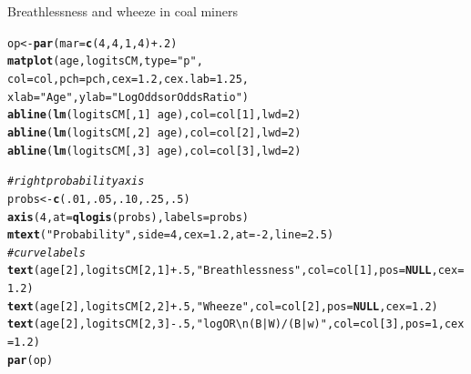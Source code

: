 \documentclass[11pt]{book}\usepackage[]{graphicx}\usepackage[]{color}
\makeatletter
\newcommand{\hlnum}[1]{\textcolor[rgb]{0.686,0.059,0.569}{#1}}%
\newcommand{\hlstr}[1]{\textcolor[rgb]{0.192,0.494,0.8}{#1}}%
\newcommand{\hlcom}[1]{\textcolor[rgb]{0.678,0.584,0.686}{\textit{#1}}}%
\newcommand{\hlopt}[1]{\textcolor[rgb]{0,0,0}{#1}}%
\newcommand{\hlstd}[1]{\textcolor[rgb]{0.345,0.345,0.345}{#1}}%
\newcommand{\hlkwa}[1]{\textcolor[rgb]{0.161,0.373,0.58}{\textbf{#1}}}%
\newcommand{\hlkwb}[1]{\textcolor[rgb]{0.69,0.353,0.396}{#1}}%
\newcommand{\hlkwc}[1]{\textcolor[rgb]{0.333,0.667,0.333}{#1}}%
\newcommand{\hlkwd}[1]{\textcolor[rgb]{0.737,0.353,0.396}{\textbf{#1}}}%
\newenvironment{kframe}{%
 \def\at@end@of@kframe{}%
 \ifinner\ifhmode%
  \def\at@end@of@kframe{\end{minipage}}%
  \begin{minipage}{\columnwidth}%
 \fi\fi%
 \def\FrameCommand##1{\hskip\@totalleftmargin \hskip-\fboxsep
 \colorbox{shadecolor}{##1}\hskip-\fboxsep
     \hskip-\linewidth \hskip-\@totalleftmargin \hskip\columnwidth}%
 \MakeFramed {\advance\hsize-\width
   \@totalleftmargin\z@ \linewidth\hsize
   \@setminipage}}%
 {\par\unskip\endMakeFramed%
 \at@end@of@kframe}
\newenvironment{knitrout}{}{} %
\renewenvironment{knitrout}{\small\renewcommand{\baselinestretch}{.85}}{} %
\makeatother
\begin{document}
\begin{Example}[coalminers]{Breathlessness and wheeze in coal miners}
\begin{knitrout}
\begin{kframe}
\begin{alltt}
\hlstd{op} \hlkwb{<-} \hlkwd{par}\hlstd{(}\hlkwc{mar}\hlstd{=}\hlkwd{c}\hlstd{(}\hlnum{4}\hlstd{,} \hlnum{4}\hlstd{,} \hlnum{1}\hlstd{,} \hlnum{4}\hlstd{)}\hlopt{+}\hlnum{.2}\hlstd{)}
\hlkwd{matplot}\hlstd{(age, logitsCM,} \hlkwc{type}\hlstd{=}\hlstr{"p"}\hlstd{,}
  \hlkwc{col}\hlstd{=col,} \hlkwc{pch}\hlstd{=pch,} \hlkwc{cex}\hlstd{=}\hlnum{1.2}\hlstd{,} \hlkwc{cex.lab}\hlstd{=}\hlnum{1.25}\hlstd{,}
  \hlkwc{xlab}\hlstd{=}\hlstr{"Age"}\hlstd{,} \hlkwc{ylab}\hlstd{=}\hlstr{"Log Odds or Odds Ratio"}\hlstd{)}
\hlkwd{abline}\hlstd{(}\hlkwd{lm}\hlstd{(logitsCM[,}\hlnum{1}\hlstd{]} \hlopt{~} \hlstd{age),} \hlkwc{col}\hlstd{=col[}\hlnum{1}\hlstd{],} \hlkwc{lwd}\hlstd{=}\hlnum{2}\hlstd{)}
\hlkwd{abline}\hlstd{(}\hlkwd{lm}\hlstd{(logitsCM[,}\hlnum{2}\hlstd{]} \hlopt{~} \hlstd{age),} \hlkwc{col}\hlstd{=col[}\hlnum{2}\hlstd{],} \hlkwc{lwd}\hlstd{=}\hlnum{2}\hlstd{)}
\hlkwd{abline}\hlstd{(}\hlkwd{lm}\hlstd{(logitsCM[,}\hlnum{3}\hlstd{]} \hlopt{~} \hlstd{age),} \hlkwc{col}\hlstd{=col[}\hlnum{3}\hlstd{],} \hlkwc{lwd}\hlstd{=}\hlnum{2}\hlstd{)}

\hlcom{# right probability axis}
\hlstd{probs} \hlkwb{<-} \hlkwd{c}\hlstd{(}\hlnum{.01}\hlstd{,} \hlnum{.05}\hlstd{,} \hlnum{.10}\hlstd{,} \hlnum{.25}\hlstd{,} \hlnum{.5}\hlstd{)}
\hlkwd{axis}\hlstd{(}\hlnum{4}\hlstd{,} \hlkwc{at}\hlstd{=}\hlkwd{qlogis}\hlstd{(probs),} \hlkwc{labels}\hlstd{=probs)}
\hlkwd{mtext}\hlstd{(}\hlstr{"Probability"}\hlstd{,} \hlkwc{side}\hlstd{=}\hlnum{4}\hlstd{,} \hlkwc{cex}\hlstd{=}\hlnum{1.2}\hlstd{,} \hlkwc{at}\hlstd{=}\hlopt{-}\hlnum{2}\hlstd{,} \hlkwc{line}\hlstd{=}\hlnum{2.5}\hlstd{)}
\hlcom{# curve labels}
\hlkwd{text}\hlstd{(age[}\hlnum{2}\hlstd{], logitsCM[}\hlnum{2}\hlstd{,}\hlnum{1}\hlstd{]}\hlopt{+}\hlnum{.5}\hlstd{,} \hlstr{"Breathlessness"}\hlstd{,} \hlkwc{col}\hlstd{=col[}\hlnum{1}\hlstd{],} \hlkwc{pos}\hlstd{=}\hlkwa{NULL}\hlstd{,} \hlkwc{cex}\hlstd{=}\hlnum{1.2}\hlstd{)}
\hlkwd{text}\hlstd{(age[}\hlnum{2}\hlstd{], logitsCM[}\hlnum{2}\hlstd{,}\hlnum{2}\hlstd{]}\hlopt{+}\hlnum{.5}\hlstd{,} \hlstr{"Wheeze"}\hlstd{,} \hlkwc{col}\hlstd{=col[}\hlnum{2}\hlstd{],} \hlkwc{pos}\hlstd{=}\hlkwa{NULL}\hlstd{,} \hlkwc{cex}\hlstd{=}\hlnum{1.2}\hlstd{)}
\hlkwd{text}\hlstd{(age[}\hlnum{2}\hlstd{], logitsCM[}\hlnum{2}\hlstd{,}\hlnum{3}\hlstd{]}\hlopt{-}\hlnum{.5}\hlstd{,} \hlstr{"log OR\textbackslash{}n(B|W)/(B|w)"}\hlstd{,} \hlkwc{col}\hlstd{=col[}\hlnum{3}\hlstd{],} \hlkwc{pos}\hlstd{=}\hlnum{1}\hlstd{,} \hlkwc{cex}\hlstd{=}\hlnum{1.2}\hlstd{)}
\hlkwd{par}\hlstd{(op)}
\end{alltt}
\end{kframe}\begin{figure}[!htb]



\end{figure}
\end{knitrout}
\end{Example}
\end{document}
